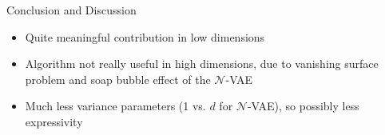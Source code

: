 \begin{frame}{Conclusion and Discussion}
  \begin{itemize}
    \item Quite meaningful contribution in low dimensions
    \item Algorithm not really useful in high dimensions, due to vanishing surface problem
    and soap bubble effect of the $\mathcal{N}$-VAE
    \item Much less variance parameters (1 vs. $d$ for $\mathcal{N}$-VAE), so possibly less expressivity
  \end{itemize}
  
  \end{frame}